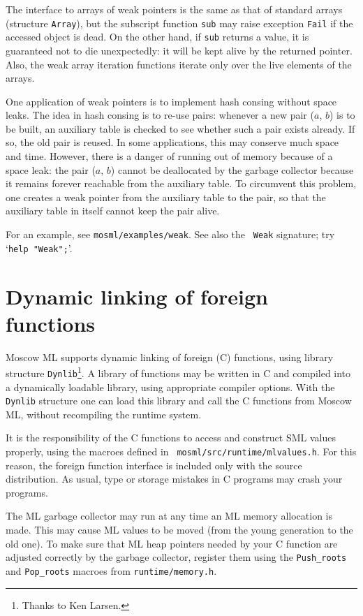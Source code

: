 \documentclass[fleqn]{article}
\begin{document}
The interface to arrays of weak pointers is the same as that of
standard arrays (structure {\tt Array}), but the subscript function
{\tt sub} may raise exception {\tt Fail} if the accessed object is
dead.  On the other hand, if {\tt sub} returns a value, it is
guaranteed not to die unexpectedly: it will be kept alive by the
returned pointer.  Also, the weak array iteration functions iterate
only over the live elements of the arrays.

One application of weak pointers is to implement hash consing without
space leaks.  The idea in hash consing is to re-use pairs: whenever a
new pair ($a$, $b$) is to be built, an auxiliary table is checked to
see whether such a pair exists already.  If so, the old pair is
reused.  In some applications, this may conserve much space and time.
However, there is a danger of running out of memory because of a space
leak: the pair ($a$, $b$) cannot be deallocated by the garbage
collector because it remains forever reachable from the auxiliary
table.  To circumvent this problem, one creates a weak pointer from
the auxiliary table to the pair, so that the auxiliary table in itself
cannot keep the pair alive.

For an example, see {\tt mosml/examples/weak}.  See also the {\tt
  Weak} signature; try `{\tt help "Weak";}'.


\section{Dynamic linking of foreign functions}
\label{sec-dynamic-linking}

Moscow ML supports dynamic linking of foreign (C) functions, using
library structure {\tt Dynlib}\footnote{Thanks to Ken Larsen.}.  A
library of functions may be written in C and compiled into a
dynamically loadable library, using appropriate compiler options.
With the {\tt Dynlib} structure one can load this library and call the
C functions from Moscow ML, without recompiling the runtime system.

It is the responsibility of the C functions to access and construct
SML values properly, using the macroes defined in {\tt
  mosml/src/runtime/mlvalues.h}.  For this reason, the foreign
function interface is included only with the source distribution.  As
usual, type or storage mistakes in C programs may crash your programs.

The ML garbage collector may run at any time an ML memory allocation
is made.  This may cause ML values to be moved (from the young
generation to the old one).  To make sure that ML heap pointers needed
by your C function are adjusted correctly by the garbage collector,
register them using the \verb+Push_roots+ and \verb+Pop_roots+ macroes
from {\tt runtime/memory.h}.
\end{document}
